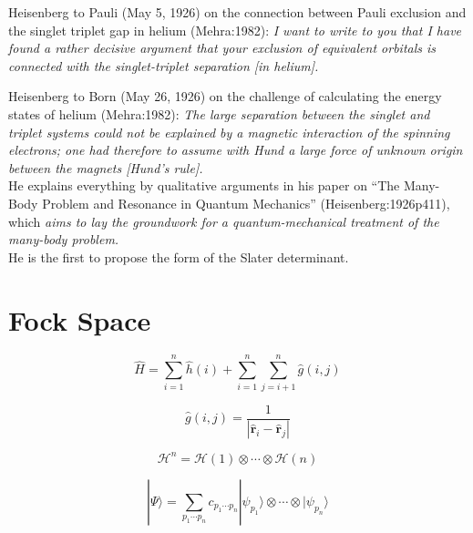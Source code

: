 Heisenberg to Pauli (May 5, 1926) on the connection between Pauli exclusion and
the singlet triplet gap in helium (Mehra:1982):
{\itshape
    I want to write to you that I have found a rather decisive argument that
    your exclusion of equivalent orbitals is connected with the singlet-triplet
    separation [in helium].
}

Heisenberg to Born (May 26, 1926) on the challenge of calculating the energy
states of helium (Mehra:1982):
{\itshape
    The large separation between the singlet and triplet systems could not be
    explained by a magnetic interaction of the spinning electrons; one had
    therefore to assume with Hund a large force of unknown origin between the
    magnets [Hund's rule].
}
\\
He explains everything by qualitative arguments in his paper on ``The Many-Body
Problem and Resonance in Quantum Mechanics'' (Heisenberg:1926p411), which
{\itshape
    aims to lay the groundwork for a quantum-mechanical treatment of the
    many-body problem.
}
\\
He is the first to propose the form of the Slater determinant.



\section{Fock Space}

\begin{equation}
    \hat{H}
    =
    \sum_{i=1}^n
    \hat{h}(i)
    +
    \sum_{i=1}^n
    \sum_{j=i+1}^n
    \hat{g}(i,j)
\end{equation}

\begin{equation}
    \hat{g}(i,j)
    =
    \frac{1}{|\hat{\mathbf{r}}_i-\hat{\mathbf{r}}_j|}
\end{equation}

\begin{equation}
    \mathcal{H}^n
    =
    \mathcal{H}(1)\otimes\cdots\otimes\mathcal{H}(n)
\end{equation}

\begin{equation}
    |\Psi\rangle
    =
    \sum_{p_1\cdots p_n}
    c_{p_1\cdots p_n}
    |\psi_{p_1}\rangle
    \otimes
    \cdots
    \otimes
    |\psi_{p_n}\rangle
\end{equation}
